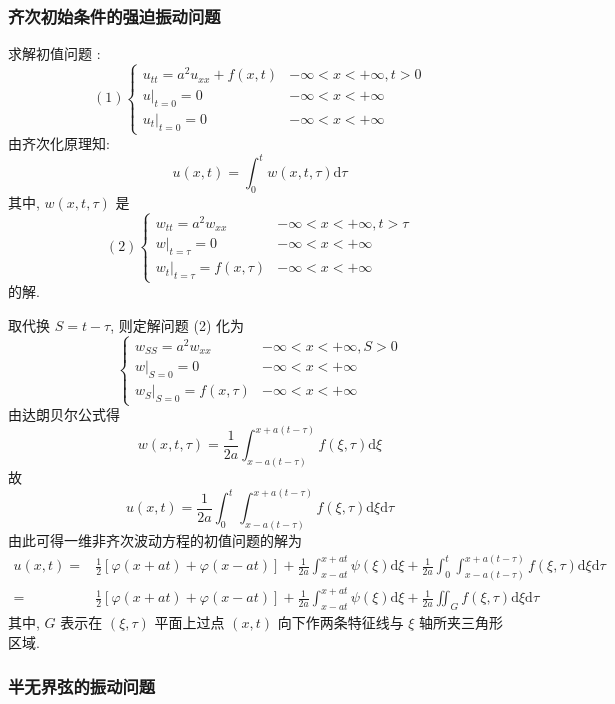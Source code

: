 \subsubsection{齐次初始条件的强迫振动问题}
求解初值问题 :
$$
(1)\left\{\begin{array}{ll}
u_{t t}=a^{2} u_{x x}+f(x, t) & -\infty<x<+\infty, t>0 \\
\left.u\right|_{t=0}=0 & -\infty<x<+\infty \\
\left.u_{t}\right|_{t=0}=0 & -\infty<x<+\infty
\end{array}\right.
$$
由齐次化原理知:
$$
u(x, t)=\int_{0}^{t} w(x, t, \tau) \mathrm{d} \tau
$$
其中, $ w(x, t, \tau) $ 是
$$
(2)\left\{\begin{array}{ll}
w_{t t}=a^{2} w_{x x} & -\infty<x<+\infty, t>\tau \\
\left.w\right|_{t=\tau}=0 & -\infty<x<+\infty \\
\left.w_{t}\right|_{t=\tau}=f(x, \tau) & -\infty<x<+\infty
\end{array}\right.
$$
的解.

取代换 $ S=t-\tau $, 则定解问题 (2) 化为
$$
\left\{\begin{array}{ll}
w_{S S}=a^{2} w_{x x} & -\infty<x<+\infty, S>0 \\
\left.w\right|_{S=0}=0 & -\infty<x<+\infty \\
\left.w_{S}\right|_{S=0}=f(x, \tau) & -\infty<x<+\infty
\end{array}\right.
$$
由达朗贝尔公式得
$$
w(x, t, \tau)=\frac{1}{2 a} \int_{x-a(t-\tau)}^{x+a(t-\tau)} f(\xi, \tau) \mathrm{d} \xi
$$
故
$$
u(x, t)=\frac{1}{2 a} \int_{0}^{t} \int_{x-a(t-\tau)}^{x+a(t-\tau)} f(\xi, \tau) \mathrm{d} \xi \mathrm{d} \tau
$$
由此可得一维非齐次波动方程的初值问题的解为
$$
\begin{aligned}
u(x, t)= & \frac{1}{2}[\varphi(x+a t)+\varphi(x-a t)]+\frac{1}{2 a} \int_{x-a t}^{x+a t} \psi(\xi) \mathrm{d} \xi+  \frac{1}{2 a} \int_{0}^{t} \int_{x-a(t-\tau)}^{x+a(t-\tau)} f(\xi, \tau) \mathrm{d} \xi \mathrm{d} \tau \\
= & \frac{1}{2}[\varphi(x+a t)+\varphi(x-a t)]+  \frac{1}{2 a} \int_{x-a t}^{x+a t} \psi(\xi) \mathrm{d} \xi+  \frac{1}{2 a} \iint_{G} f(\xi, \tau) \mathrm{d} \xi \mathrm{d} \tau
\end{aligned}
$$
其中, $ G $ 表示在 $ (\xi, \tau) $ 平面上过点 $ (x, t) $ 向下作两条特征线与 $ \xi $ 轴所夹三角形区域.

\subsubsection{半无界弦的振动问题}

